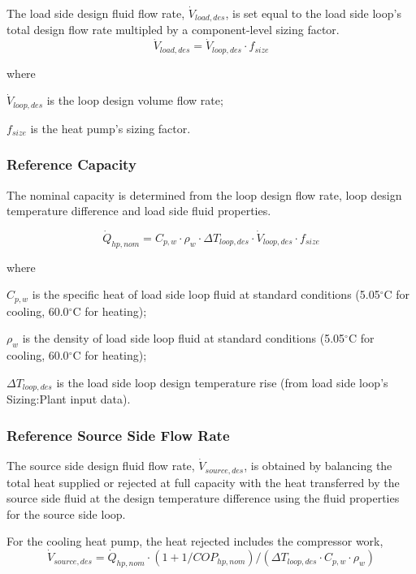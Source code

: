 The load side design fluid flow rate, \( \dot V_{load,des} \), is set equal to the load side loop's total design flow rate multipled by a component-level sizing factor.
\begin{equation}
\dot V_{load,des} = \dot V_{loop,des} \cdot f_{size}
\end{equation}

where

\( \dot V_{loop,des} \) is the loop design volume flow rate;

\( f_{size} \) is the heat pump's sizing factor.

\subsubsection{Reference Capacity}\label{wwhp-ref-capacity}

The nominal capacity is determined from the loop design flow rate, loop design temperature difference and load side fluid properties.

\begin{equation}
\dot Q_{hp,nom} = C_{p,w} \cdot \rho_w \cdot \Delta T_{loop,des} \cdot \dot V_{loop,des} \cdot f_{size}
\end{equation}

where

\( C_{p,w} \) is the specific heat of load side loop fluid at standard conditions (5.05\(^{\circ}\)C for cooling, 60.0\(^{\circ}\)C for heating);

\( \rho_w \) is the density of load side loop fluid at standard conditions (5.05\(^{\circ}\)C for cooling, 60.0\(^{\circ}\)C for heating);

\( \Delta T_{loop,des} \) is the load side loop design temperature rise (from load side loop's Sizing:Plant input data).

\subsubsection{Reference Source Side Flow Rate}\label{WWHP-ref-source-side-flow-rate}

The source side design fluid flow rate, \( \dot V_{source,des} \), is obtained by balancing the total heat supplied or rejected at full capacity with the heat transferred by the source side fluid at the design temperature difference using the fluid properties for the source side loop.

For the cooling heat pump, the heat rejected includes the compressor work,
\begin{equation}
\dot V_{source,des} = \dot Q_{hp,nom} \cdot (1 + 1/COP_{hp,nom})/(\Delta T_{loop,des} \cdot C_{p,w} \cdot \rho_w)
\end{equation}

